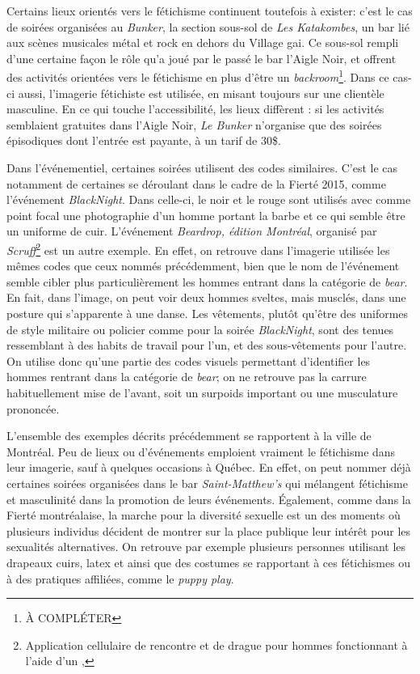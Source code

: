 Certains lieux orientés vers le fétichisme continuent toutefois à exister: c'est le cas de soirées organisées au \emph{Bunker}, la section sous-sol de \emph{Les Katakombes}, un bar lié aux scènes musicales métal et rock en dehors du Village gai.
Ce sous-sol rempli d'une certaine façon le rôle qu'a joué par le passé le bar l'Aigle Noir, et offrent des activités orientées vers le fétichisme en plus d'être un \emph{backroom}\footnote{À COMPLÉTER}.
Dans ce cas-ci aussi, l'imagerie fétichiste est utilisée, en misant toujours sur une clientèle masculine.
En ce qui touche l'accessibilité, les lieux diffèrent : si les activités semblaient gratuites dans l'Aigle Noir, \emph{Le Bunker} n'organise que des soirées épisodiques dont l'entrée est payante, à un tarif de 30\$.

Dans l'événementiel, certaines soirées utilisent des codes similaires.
C'est le cas notamment de certaines se déroulant dans le cadre de la Fierté 2015, comme l'événement  \emph{BlackNight}.
Dans celle-ci, le noir et le rouge sont utilisés avec comme point focal une photographie d'un homme portant la barbe et ce qui semble être un uniforme de cuir.
L'événement \emph{Beardrop, édition Montréal}, organisé par \emph{Scruff}\footnote{Application cellulaire de rencontre et de drague pour hommes fonctionnant à l'aide d'un \gps{} ,} est un autre exemple.
En effet, on retrouve dans l'imagerie utilisée les mêmes codes que ceux nommés précédemment, bien que le nom de l'événement semble cibler plus particulièrement les hommes entrant dans la catégorie de \emph{bear}.
En fait, dans l'image, on peut voir deux hommes sveltes, mais musclés, dans une posture qui s'apparente à une danse.
Les vêtements, plutôt qu'être des uniformes de style militaire ou policier comme pour la soirée \emph{BlackNight}, sont des tenues ressemblant à des habits de travail pour l'un, et des sous-vêtements pour l'autre.
On utilise donc qu'une partie des codes visuels permettant d'identifier les hommes rentrant dans la catégorie de \emph{bear}; on ne retrouve pas la carrure habituellement mise de l'avant, soit un surpoids important ou une musculature prononcée.

L'ensemble des exemples décrits précédemment se rapportent à la ville de Montréal.
Peu de lieux ou d'événements emploient vraiment le fétichisme dans leur imagerie, sauf à quelques occasions à Québec.
En effet, on peut nommer déjà certaines soirées organisées dans le bar \emph{Saint-Matthew's} qui mélangent fétichisme et masculinité dans la promotion de leurs événements.
Également, comme dans la Fierté montréalaise, la marche pour la diversité sexuelle est un des moments où plusieurs individus décident de montrer sur la place publique leur intérêt pour les sexualités alternatives.
On retrouve par exemple plusieurs personnes utilisant les drapeaux cuirs, latex et \bdsm{} ainsi que des costumes se rapportant à ces fétichismes ou à des pratiques affiliées, comme le \emph{puppy play}.

